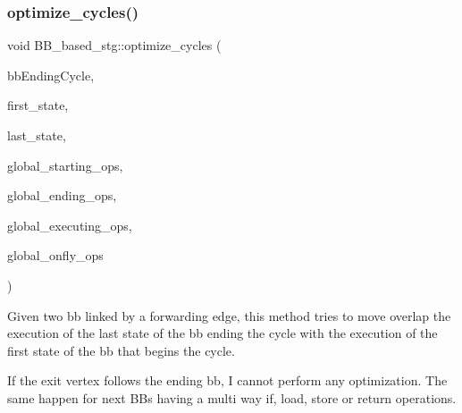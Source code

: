 \subsubsection{\texorpdfstring{optimize\+\_\+cycles()}{optimize\_cycles()}}
{\footnotesize\ttfamily void B\+B\+\_\+based\+\_\+stg\+::optimize\+\_\+cycles (\begin{DoxyParamCaption}\item[{\hyperlink{graph_8hpp_abefdcf0544e601805af44eca032cca14}{vertex}}]{bb\+Ending\+Cycle,  }\item[{\hyperlink{custom__map_8hpp_ad1ed68f2ff093683ab1a33522b144adc}{Custom\+Unordered\+Map}$<$ \hyperlink{graph_8hpp_abefdcf0544e601805af44eca032cca14}{vertex}, \hyperlink{graph_8hpp_abefdcf0544e601805af44eca032cca14}{vertex} $>$ \&}]{first\+\_\+state,  }\item[{\hyperlink{custom__map_8hpp_ad1ed68f2ff093683ab1a33522b144adc}{Custom\+Unordered\+Map}$<$ \hyperlink{graph_8hpp_abefdcf0544e601805af44eca032cca14}{vertex}, \hyperlink{graph_8hpp_abefdcf0544e601805af44eca032cca14}{vertex} $>$ \&}]{last\+\_\+state,  }\item[{std\+::map$<$ \hyperlink{graph_8hpp_abefdcf0544e601805af44eca032cca14}{vertex}, std\+::list$<$ \hyperlink{graph_8hpp_abefdcf0544e601805af44eca032cca14}{vertex} $>$$>$ \&}]{global\+\_\+starting\+\_\+ops,  }\item[{std\+::map$<$ \hyperlink{graph_8hpp_abefdcf0544e601805af44eca032cca14}{vertex}, std\+::list$<$ \hyperlink{graph_8hpp_abefdcf0544e601805af44eca032cca14}{vertex} $>$$>$ \&}]{global\+\_\+ending\+\_\+ops,  }\item[{std\+::map$<$ \hyperlink{graph_8hpp_abefdcf0544e601805af44eca032cca14}{vertex}, std\+::list$<$ \hyperlink{graph_8hpp_abefdcf0544e601805af44eca032cca14}{vertex} $>$$>$ \&}]{global\+\_\+executing\+\_\+ops,  }\item[{std\+::map$<$ \hyperlink{graph_8hpp_abefdcf0544e601805af44eca032cca14}{vertex}, std\+::list$<$ \hyperlink{graph_8hpp_abefdcf0544e601805af44eca032cca14}{vertex} $>$$>$ \&}]{global\+\_\+onfly\+\_\+ops }\end{DoxyParamCaption})\hspace{0.3cm}{\ttfamily [private]}}



Given two bb linked by a forwarding edge, this method tries to move overlap the execution of the last state of the bb ending the cycle with the execution of the first state of the bb that begins the cycle. 

If the exit vertex follows the ending bb, I cannot perform any optimization. The same happen for next B\+Bs having a multi way if, load, store or return operations. 

